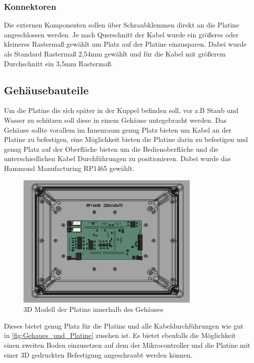 \subsubsection{Konnektoren}
Die externen Komponenten sollen über Schraubklemmen direkt an die Platine angeschlossen werden. Je nach Querschnitt der Kabel wurde ein größeres oder kleineres Rastermaß gewählt um Platz auf der Platine einzusparen. Dabei wurde als Standard Rastermaß 2,54mm gewählt und für die Kabel mit größerem Durchschnitt ein 3,5mm Rastermaß.

\subsection{Gehäusebauteile}
Um die Platine die sich später in der Kuppel befinden soll, vor z.B Staub und Wasser zu schützen soll diese in einem Gehäuse untegebracht werden. Das Gehäuse sollte vorallem im Innenraum genug Platz bieten um Kabel an der Platine zu befestigen, eine Möglichkeit bieten die Platine darin zu befestigen und genug Platz auf der Oberfläche bieten um die Bedienoberfläche und die unterschiedlichen Kabel Durchführungen zu positionieren. Dabei wurde das Hammond Manufacturing RP1465 gewählt. 
\begin{figure}[H]
	\centering
	\includegraphics[width=0.8\textwidth]{images/Hardware/Platine_in_gehause.PNG}
	\caption{3D Modell der Platine innerhalb des Gehäuses}
	\label{fig:Gehaues_und_Platine}
\end{figure}
\noindent Dieses bietet genug Platz für die Platine und alle Kabeldurchführungen wie gut in \autoref{fig:Gehaues_und_Platine} zusehen ist. Es bietet ebenfalls die Möglichkeit einen zweiten Boden einzusetzen auf dem der Mikrocontroller und die Platine mit einer 3D gedruckten Befestigung angeschraubt werden können.\\

